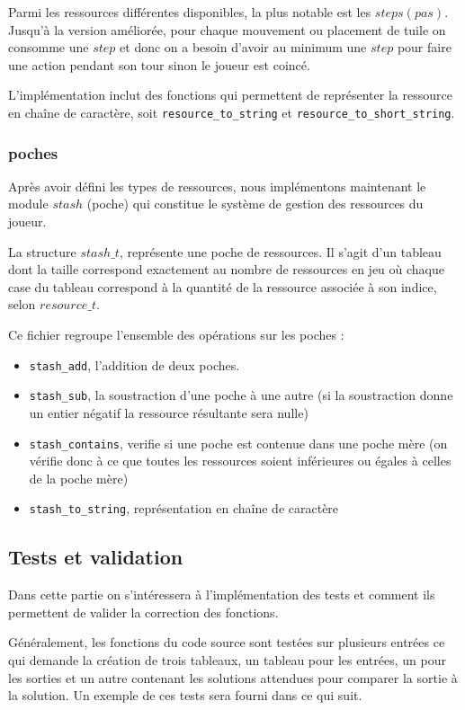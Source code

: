 Parmi les ressources différentes disponibles, la plus notable est les $steps(pas)$. Jusqu'à la version améliorée, pour chaque mouvement ou placement de tuile on consomme une $step$ et donc on a besoin d'avoir au minimum une $step$ pour faire une action pendant son tour sinon le joueur est coincé.

L'implémentation inclut des fonctions qui permettent de représenter la ressource en chaîne de caractère, soit \texttt{resource\_to\_string} et \texttt{resource\_to\_short\_string}.

\subsubsection{poches}\label{sssec:stashes}

Après avoir défini les types de ressources, nous implémentons maintenant le module $stash$ (poche) qui constitue le système de gestion des ressources du joueur.

La structure $stash\_t$, représente une poche de ressources. Il s'agit d'un tableau dont la taille correspond exactement au nombre de ressources en jeu où chaque case du tableau correspond à la quantité de la ressource associée à son indice, selon $resource\_t$.

Ce fichier regroupe l'ensemble des opérations sur les poches :
\begin{itemize}
    \item \texttt{stash\_add}, l'addition de deux poches.
    \item \texttt{stash\_sub}, la soustraction d'une poche à une autre (si la soustraction donne un entier négatif la ressource résultante sera nulle)
    \item \texttt{stash\_contains}, verifie si une poche est contenue dans une poche mère (on vérifie donc à ce que toutes les ressources soient inférieures ou égales à celles de la poche mère)
    \item \texttt{stash\_to\_string}, représentation en chaîne de caractère
\end{itemize}

\subsection{Tests et validation}

Dans cette partie on s'intéressera à l'implémentation des tests et comment ils permettent de valider la correction des fonctions.

Généralement, les fonctions du code source sont testées sur plusieurs entrées ce qui demande la création de trois tableaux, un tableau pour les entrées, un pour les sorties et un autre contenant les solutions attendues pour comparer la sortie à la solution.
Un exemple de ces tests sera fourni dans ce qui suit.


